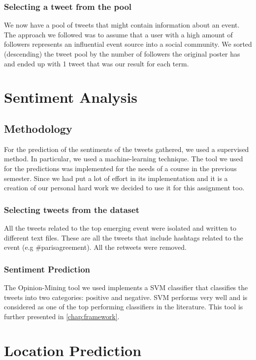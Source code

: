 \documentclass[12pt,svgnames]{report}
\begin{document}
\subsubsection*{Selecting a tweet from the pool}
We now have a pool of tweets that might contain information about an event. The approach we followed was to assume that a user with a high amount of followers represents an influential event source  into a social community\cite{cataldi2013personalized}. We sorted (descending) the tweet pool by the number of followers the original poster has and ended up with 1 tweet that was our result for each term.
\section*{Sentiment Analysis}

\subsection*{Methodology}
For the prediction of the sentiments of the tweets gathered, we used a supervised method. In particular, we used a machine-learning technique. The tool we used for the predictions was implemented for the needs of a course in the previous semester. Since we had put a lot of effort in its implementation and it is a creation of our personal hard work we decided to use it for this assignment too.

\subsubsection*{Selecting tweets from the dataset}
All the tweets related to the top emerging event were isolated and written to different text files. These are all the tweets that include hashtags related to the event (e.g \#parisagreement). All the retweets  were removed. 

\subsubsection*{Sentiment Prediction}
The Opinion-Mining tool\cite{opinion} we used implements a SVM classifier that classifies the tweets into two categories: positive and negative. SVM performs very well and is considered as one of the top performing classifiers in the literature. This tool is further presented in \autoref{chap:framework}.

\section*{Location Prediction}
\end{document}
